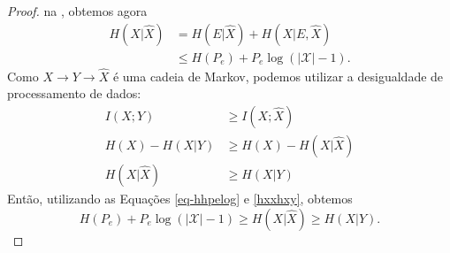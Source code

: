 \begin{proof}
  na , obtemos agora
  \begin{subequations}\label{eq-hhpelog}
    \begin{align}
      H(X|\hat{X}) &= H(E|\hat{X}) + H(X|E,\hat{X}) \\
                   &\leq H(P_e) + P_e \log (\vert \mathcal{X} \vert - 1) .
    \end{align}
  \end{subequations}
  Como $X \rightarrow Y \rightarrow \hat{X}$ é uma cadeia de Markov, podemos utilizar a
  desigualdade de processamento de dados:
  \begin{subequations}\label{hxxhxy}
    \begin{align}
      I(X;Y)        &\geq I(X;\hat{X}) \\
      H(X) - H(X|Y) &\geq H(X) - H(X|\hat{X}) \\
      H(X|\hat{X})  &\geq H(X|Y)
    \end{align}
  \end{subequations}
  Então, utilizando as Equações \ref{eq-hhpelog} e \ref{hxxhxy}, obtemos
  \begin{equation}
    H(P_e) + P_e \log (\vert \mathcal{X} \vert - 1) \geq H(X|\hat{X}) \geq H(X|Y) .
  \end{equation}
\end{proof}




